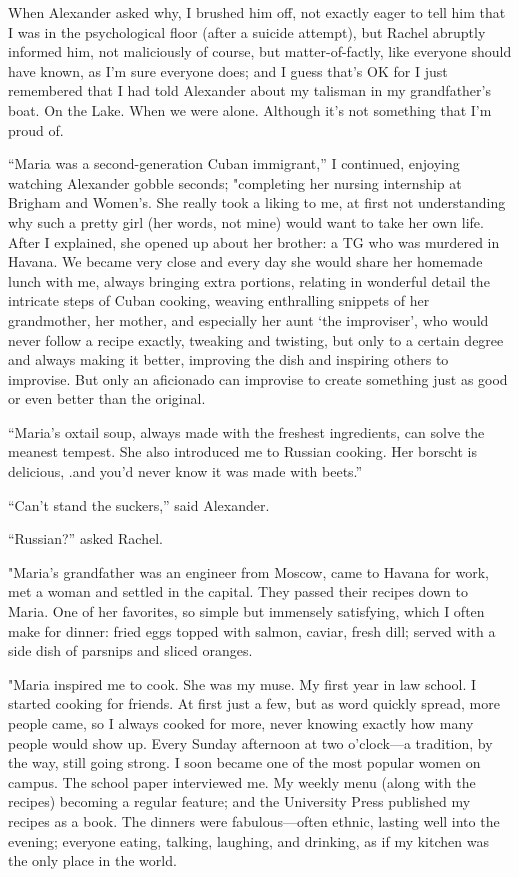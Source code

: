 When Alexander asked why, I brushed him off, not exactly eager to tell
him that I was in the psychological floor (after a suicide attempt), but
Rachel abruptly informed him, not maliciously of course, but
matter-of-factly, like everyone should have known, as I'm sure everyone
does; and I guess that's OK for I just remembered that I had told
Alexander about my talisman in my grandfather's boat. On the Lake. When
we were alone. Although it's not something that I'm proud of.

``Maria was a second-generation Cuban immigrant,'' I continued, enjoying
watching Alexander gobble seconds; "completing her nursing internship at
Brigham and Women's. She really took a liking to me, at first not
understanding why such a pretty girl (her words, not mine) would want to
take her own life. After I explained, she opened up about her brother: a
TG who was murdered in Havana. We became very close and every day she
would share her homemade lunch with me, always bringing extra portions,
relating in wonderful detail the intricate steps of Cuban cooking,
weaving enthralling snippets of her grandmother, her mother, and
especially her aunt `the improviser', who would never follow a recipe
exactly, tweaking and twisting, but only to a certain degree and always
making it better, improving the dish and inspiring others to improvise.
But only an aficionado can improvise to create something just as good or
even better than the original.

``Maria's oxtail soup, always made with the freshest ingredients, can
solve the meanest tempest. She also introduced me to Russian cooking.
Her borscht is delicious, .and you'd never know it was made with
beets.''

``Can't stand the suckers,'' said Alexander.

``Russian?'' asked Rachel.

"Maria's grandfather was an engineer from Moscow, came to Havana for
work, met a woman and settled in the capital. They passed their recipes
down to Maria. One of her favorites, so simple but immensely satisfying,
which I often make for dinner: fried eggs topped with salmon, caviar,
fresh dill; served with a side dish of parsnips and sliced oranges.

"Maria inspired me to cook. She was my muse. My first year in law
school. I started cooking for friends. At first just a few, but as word
quickly spread, more people came, so I always cooked for more, never
knowing exactly how many people would show up. Every Sunday afternoon at
two o'clock---a tradition, by the way, still going strong. I soon became
one of the most popular women on campus. The school paper interviewed
me. My weekly menu (along with the recipes) becoming a regular feature;
and the University Press published my recipes as a book. The dinners
were fabulous---often ethnic, lasting well into the evening; everyone
eating, talking, laughing, and drinking, as if my kitchen was the only
place in the world.

